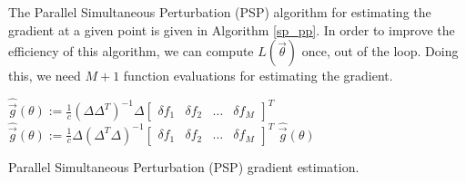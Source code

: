 The Parallel Simultaneous Perturbation (PSP) algorithm for estimating the gradient at a given point is given in Algorithm \ref{sp_pp}. In order to improve the efficiency of this algorithm, we can compute $L(\vec{\theta})$ once, out of the loop. Doing this, we need $M+1$ function evaluations for estimating the gradient.

\begin{algorithm}
\begin{algorithmic}
	\ENDIF
\ENDWHILE
{}
      		\STATE $ \hat{\vec{g}}(\theta) :=\frac{1}{c} \left(\Delta \Delta^T \right)^{-1} \Delta \begin{bmatrix} \delta f_1 & \delta f_2 & \hdots & \delta f_M\end{bmatrix}^T$
\ELSE
		\STATE $ \hat{\vec{g}}(\theta) :=\frac{1}{c} \Delta \left(\Delta^T \Delta \right)^{-1} \begin{bmatrix} \delta f_1 & \delta f_2 & \hdots & \delta f_M\end{bmatrix}^T$
\ENDIF
\RETURN $\hat{\vec{g}}(\theta)$
\end{algorithmic}
 \caption{Parallel Simultaneous Perturbation (PSP) gradient estimation.} \label{sp_pp}
\end{algorithm}

